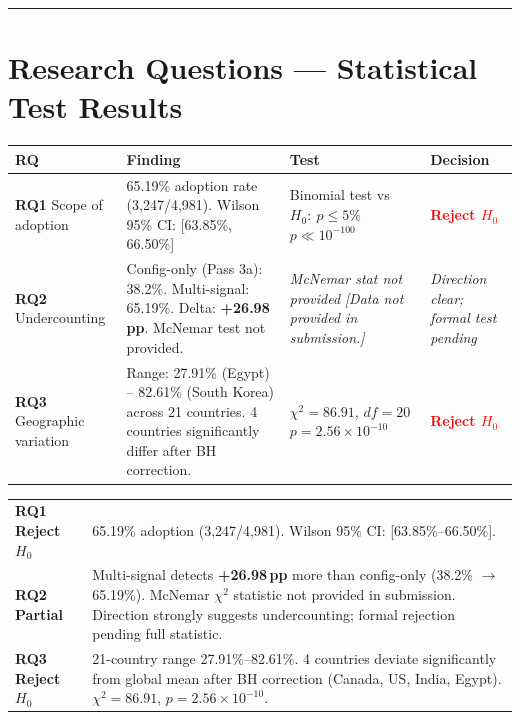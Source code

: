 \documentclass[10pt,a4paper]{article}
\begin{document}
\vspace{6pt}
\hrule
\vspace{6pt}

\section*{Research Questions --- Statistical Test Results}

\begin{tabular}{@{}p{3.2cm} p{5.5cm} p{3.2cm} p{3.0cm}@{}}
\toprule
\textbf{RQ} & \textbf{Finding} & \textbf{Test} & \textbf{Decision} \\
\midrule
\textbf{RQ1} Scope of adoption &
  65.19\% adoption rate (3,247/4,981). Wilson 95\% CI: [63.85\%, 66.50\%] &
  Binomial test vs $H_0{:}\ p \leq 5\%$ \newline $p \ll 10^{-100}$ &
  \textcolor{red}{\textbf{Reject $H_0$}} \\[4pt]
\textbf{RQ2} Undercounting &
  Config-only (Pass 3a): 38.2\%. Multi-signal: 65.19\%. Delta: \textbf{+26.98\,pp}.
  McNemar test not provided. &
  \textit{McNemar stat not provided} \newline \textit{\small [Data not provided in submission.]} &
  \textit{Direction clear; formal test pending} \\[4pt]
\textbf{RQ3} Geographic variation &
  Range: 27.91\% (Egypt) -- 82.61\% (South Korea) across 21 countries.
  4 countries significantly differ after BH correction. &
  $\chi^2 = 86.91$, $df=20$ \newline $p = 2.56 \times 10^{-10}$ &
  \textcolor{red}{\textbf{Reject $H_0$}} \\
\bottomrule
\end{tabular}

\vspace{6pt}
\renewcommand{\arraystretch}{1.4}
\noindent
\begin{tabular}{@{}
  >{\centering\arraybackslash\columncolor{red!15}}p{2.8cm}
  >{\columncolor{red!8}}p{14.0cm}@{}}
\textbf{RQ1 Reject $H_0$} &
  65.19\% adoption (3,247/4,981). Wilson 95\% CI: [63.85\%--66.50\%]. \\
\textbf{RQ2 Partial} &
  Multi-signal detects \textbf{+26.98\,pp} more than config-only (38.2\% $\to$ 65.19\%).
  McNemar $\chi^2$ statistic not provided in submission. Direction strongly suggests
  undercounting; formal rejection pending full statistic. \\
\textbf{RQ3 Reject $H_0$} &
  21-country range 27.91\%--82.61\%. 4 countries deviate significantly from global mean
  after BH correction (Canada, US, India, Egypt).
  $\chi^2 = 86.91$, $p = 2.56 \times 10^{-10}$. \\
\end{tabular}
\renewcommand{\arraystretch}{1}
\end{document}
